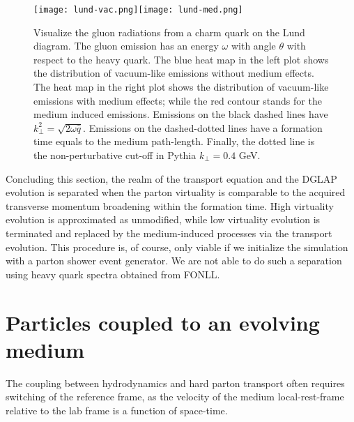 \begin{figure}
\singlespacing
\texttt{[image: lund-vac.png]}\texttt{[image: lund-med.png]}
\caption[Plotting the gluon radiations from a charm quark on the Lund]{Visualize the gluon radiations from a charm quark on the Lund diagram. The gluon emission has an energy $\omega$ with angle $\theta$ with respect to the heavy quark. The blue heat map in the left plot shows the distribution of vacuum-like emissions without medium effects. The heat map in the right plot shows the distribution of vacuum-like emissions with medium effects; while the red contour stands for the medium induced emissions. Emissions on the black dashed lines have $k_\perp^2 = \sqrt{2\omega \hat{q}}$. Emissions on the dashed-dotted lines have a formation time equals to the medium path-length. Finally, the dotted line is the non-perturbative cut-off in Pythia $k_\perp = 0.4$ GeV.}
\label{fig:lund}
\end{figure}

Concluding this section, the realm of the transport equation and the DGLAP evolution is separated when the parton virtuality is comparable to the acquired transverse momentum broadening within the formation time.
High virtuality evolution is approximated as unmodified, while low virtuality evolution is terminated and replaced by the medium-induced processes via the transport evolution. 
This procedure is, of course, only viable if we initialize the simulation with a parton shower event generator.
We are not able to do such a separation using heavy quark spectra obtained from FONLL.

\section{Particles coupled to an evolving medium}
\label{section:couple-to-hydro}
The coupling between hydrodynamics and hard parton transport often requires switching of the reference frame, as the velocity of the medium local-rest-frame relative to the lab frame is a function of space-time.

